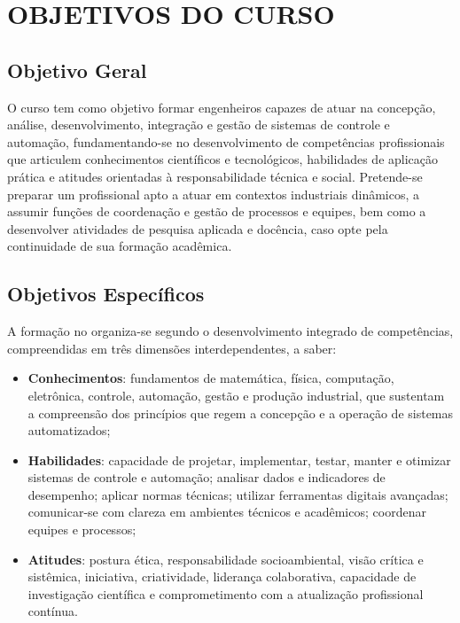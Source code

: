 \section{OBJETIVOS DO CURSO}
\label{OBJETIVOS}

\subsection{Objetivo Geral}

O curso tem como objetivo formar engenheiros capazes de atuar na concepção, análise, desenvolvimento, integração e gestão de sistemas de controle e automação, fundamentando-se no desenvolvimento de competências profissionais que articulem conhecimentos científicos e tecnológicos, habilidades de aplicação prática e atitudes orientadas à responsabilidade técnica e social. Pretende-se preparar um profissional apto a atuar em contextos industriais dinâmicos, a assumir funções de coordenação e gestão de processos e equipes, bem como a desenvolver atividades de pesquisa aplicada e docência, caso opte pela continuidade de sua formação acadêmica.

\subsection{Objetivos Específicos}

A formação no \NOMECURSO organiza-se segundo o desenvolvimento integrado de competências, compreendidas em três dimensões interdependentes, a saber:

\begin{itemize}
	\item \textbf{Conhecimentos}: fundamentos de matemática, física, computação, eletrônica, controle, automação, gestão e produção industrial, que sustentam a compreensão dos princípios que regem a concepção e a operação de sistemas automatizados;
	\item \textbf{Habilidades}: capacidade de projetar, implementar, testar, manter e otimizar sistemas de controle e automação; analisar dados e indicadores de desempenho; aplicar normas técnicas; utilizar ferramentas digitais avançadas; comunicar-se com clareza em ambientes técnicos e acadêmicos; coordenar equipes e processos;
	\item \textbf{Atitudes}: postura ética, responsabilidade socioambiental, visão crítica e sistêmica, iniciativa, criatividade, liderança colaborativa, capacidade de investigação científica e comprometimento com a atualização profissional contínua.
\end{itemize}


